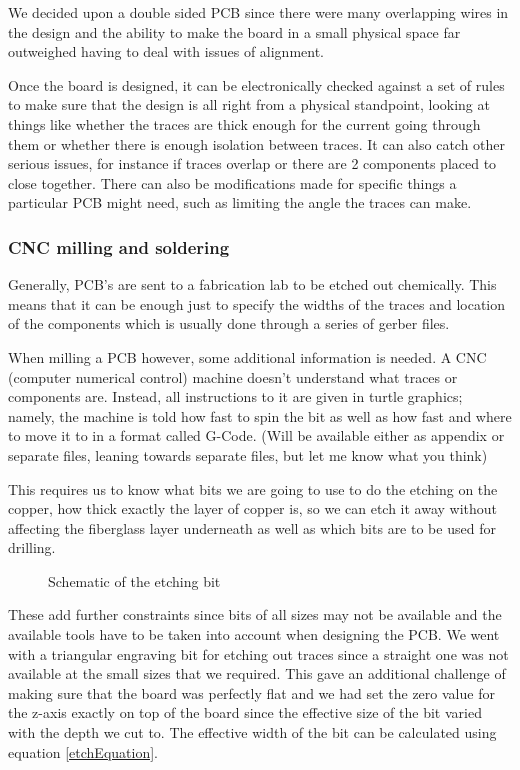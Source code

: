 \documentclass[oneside]{article}
\begin{document}
          We decided upon a double sided PCB since there were many overlapping wires in the design and the ability to make the board in a small physical space far outweighed having to deal with issues of alignment.

          Once the board is designed, it can be electronically checked against a set of rules to make sure that the design is all right from a physical standpoint, looking at things like whether the traces are thick enough for the current going through them or whether there is enough isolation between traces. It can also catch other serious issues, for instance if traces overlap or there are 2 components placed to close together. There can also be modifications made for specific things a particular PCB might need, such as limiting the angle the traces can make.

        \subsubsection{CNC milling and soldering}
          Generally, PCB's are sent to a fabrication lab to be etched out chemically. This means that it can be enough just to specify the widths of the traces and location of the components which is usually done through a series of gerber files.

          When milling a PCB however, some additional information is needed. A CNC  (computer numerical control) machine doesn't understand what traces or components are. Instead, all instructions to it are given in turtle graphics; namely, the machine is told how fast to spin the bit as well as how fast and where to move it to in a format called G-Code. (Will be available either as appendix or separate files, leaning towards separate files, but let me know what you think)

          This requires us to know what bits we are going to use to do the etching on the copper, how thick exactly the layer of copper is, so we can etch it away without affecting the fiberglass layer underneath as well as which bits are to be used for drilling.

          \begin{figure}[H]
            \centering
            \def\svgwidth{0.15\linewidth}
            
            \caption{Schematic of the etching bit}
            \label{etchBit}
          \end{figure}

          These add further constraints since bits of all sizes may not be available and the available tools have to be taken into account when designing the PCB. We went with a triangular engraving bit for etching out traces since a straight one was not available at the small sizes that we required. This gave an additional challenge of making sure that the board was perfectly flat and we had set the zero value for the z-axis exactly on top of the board since the effective size of the bit varied with the depth we cut to. The effective width of the bit can be calculated using equation \ref{etchEquation}.
\end{document}
